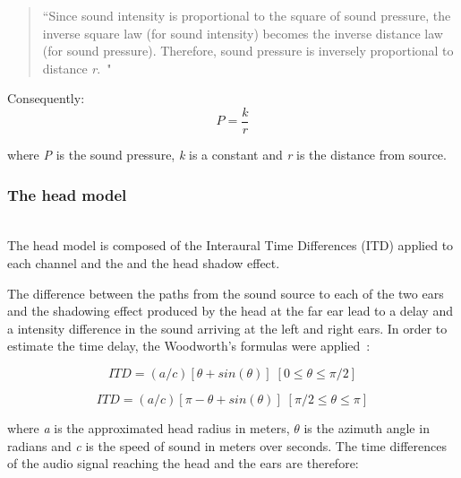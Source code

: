 \documentclass[journal]{IEEEtran}
\begin{document}
\begin{quote}
``Since sound intensity is proportional to the square of sound pressure, the inverse square law (for sound intensity) becomes the inverse distance law (for sound pressure). Therefore, sound pressure is inversely proportional to distance \textit{r}.~\cite{everest2009master}"
\end{quote}

Consequently:
\begin{equation}\label{eq:soundpressure}
P = \frac{k}{r}
\end{equation}

where \textit{P} is the sound pressure, \textit{k} is a constant and \textit{r} is the distance from source.\\


\subsubsection{The head model}~\\
The head model is composed of the Interaural Time Differences (ITD) applied to each channel and the and the head shadow effect.

The difference between the paths from the sound source to each of the two ears and the shadowing effect produced by the head at the far ear lead to a delay and a intensity difference in the sound arriving at the left and right ears.
In order to estimate the time delay, the Woodworth's formulas were applied~\cite{Woodworth}: 

\begin{equation}\label{eq:ITDfront}
ITD = (a/c)[\theta + sin(\theta)]   \; [0 \leq \theta \leq \pi/2]
\end{equation}

\begin{equation}\label{eq:ITDback}
ITD = (a/c)[\pi - \theta + sin(\theta)]  \; [\pi/2 \leq \theta \leq \pi]
\end{equation}

where \textit{a} is the approximated head radius in meters, $\theta$ is the azimuth angle in radians and \textit{c} is the speed of sound in meters over seconds. The time differences of the audio signal reaching the head and the ears are therefore:
\end{document}
